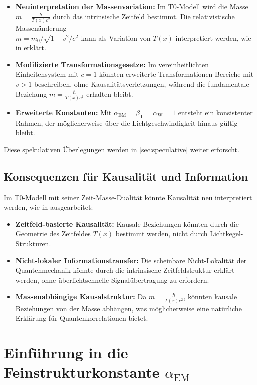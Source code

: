 \documentclass[12pt,a4paper]{article}
\newcommand{\Tfield}{T(x)}
\newcommand{\alphaEM}{\alpha_{\text{EM}}}
\newcommand{\alphaW}{\alpha_{\text{W}}}
\newcommand{\betaT}{\beta_{\text{T}}}
\begin{document}
	\begin{itemize}
		\item \textbf{Neuinterpretation der Massenvariation:} Im T0-Modell wird die Masse \(m = \frac{\hbar}{\Tfield c^2}\) durch das intrinsische Zeitfeld bestimmt. Die relativistische Massenänderung\\ \(m = m_0/\sqrt{1-v^2/c^2}\) kann als Variation von \(\Tfield\) interpretiert werden, wie in \cite{pascher_zeit_2025} erklärt.
		\item \textbf{Modifizierte Transformationsgesetze:} Im vereinheitlichten Einheitensystem mit \(c = 1\) könnten erweiterte Transformationen Bereiche mit \(v > 1\) beschreiben, ohne Kausalitätsverletzungen, während die fundamentale Beziehung \(m = \frac{\hbar}{\Tfield c^2}\) erhalten bleibt.
		\item \textbf{Erweiterte Konstanten:} Mit \(\alphaEM = \betaT = \alphaW = 1\) entsteht ein konsistenter Rahmen, der möglicherweise über die Lichtgeschwindigkeit hinaus gültig bleibt.
	\end{itemize}
	
	Diese spekulativen Überlegungen werden in \cref{sec:speculative} weiter erforscht.
	
	\subsection{Konsequenzen für Kausalität und Information}
	\label{subsec:causality}
	
	Im T0-Modell mit seiner Zeit-Masse-Dualität könnte Kausalität neu interpretiert werden, wie in \cite{pascher_feldtheorie_2025} ausgearbeitet:
	\begin{itemize}
		\item \textbf{Zeitfeld-basierte Kausalität:} Kausale Beziehungen könnten durch die Geometrie des Zeitfeldes \(\Tfield\) bestimmt werden, nicht durch Lichtkegel-Strukturen.
		\item \textbf{Nicht-lokaler Informationstransfer:} Die scheinbare Nicht-Lokalität der Quantenmechanik könnte durch die intrinsische Zeitfeldstruktur erklärt werden, ohne überlichtschnelle Signalübertragung zu erfordern.
		\item \textbf{Massenabhängige Kausalstruktur:} Da \(m = \frac{\hbar}{\Tfield c^2}\), könnten kausale Beziehungen von der Masse abhängen, was möglicherweise eine natürliche Erklärung für Quantenkorrelationen bietet.
	\end{itemize}
	
	\section{Einführung in die Feinstrukturkonstante \(\alphaEM\)}
	\label{sec:alpha_em}
	
\end{document}

